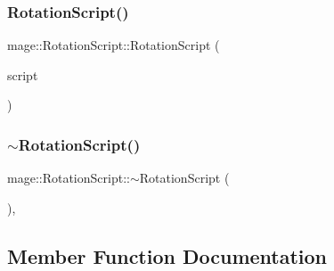 \hypertarget{classmage_1_1_rotation_script_a5c6464f8e38fde0442c3b6f49a9cbed1}{}\label{classmage_1_1_rotation_script_a5c6464f8e38fde0442c3b6f49a9cbed1} 
\subsubsection{\texorpdfstring{Rotation\+Script()}{RotationScript()}\hspace{0.1cm}{\footnotesize\ttfamily [3/3]}}
{\footnotesize\ttfamily mage\+::\+Rotation\+Script\+::\+Rotation\+Script (\begin{DoxyParamCaption}\item[{\hyperlink{classmage_1_1_rotation_script}{Rotation\+Script} \&\&}]{script }\end{DoxyParamCaption})\hspace{0.3cm}{\ttfamily [default]}}

\hypertarget{classmage_1_1_rotation_script_adc2af2d6ed93558fd66b569297b294d0}{}\label{classmage_1_1_rotation_script_adc2af2d6ed93558fd66b569297b294d0} 
\subsubsection{\texorpdfstring{$\sim$\+Rotation\+Script()}{~RotationScript()}}
{\footnotesize\ttfamily mage\+::\+Rotation\+Script\+::$\sim$\+Rotation\+Script (\begin{DoxyParamCaption}{ }\end{DoxyParamCaption})\hspace{0.3cm}{\ttfamily [virtual]}, {\ttfamily [default]}}



\subsection{Member Function Documentation}
\hypertarget{classmage_1_1_rotation_script_a6fbbbec1bd610da2c917d1ef2d05f556}{}\label{classmage_1_1_rotation_script_a6fbbbec1bd610da2c917d1ef2d05f556} 
